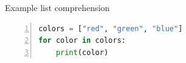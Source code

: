 \documentclass[10pt,parskip=half,
	toc=sectionentrywithdots,
	bibliography=totocnumbered,
	captions=tableheading,
    numbers=noendperiod,
    headings=standardclasses]{scrartcl}
\begin{document}
\begin{codecell}[H]

    \caption{Example list comprehension}\label{code:example_list_comp}\begin{lstlisting}[language=Python,numbers=left,xleftmargin=20pt,xrightmargin=5pt,belowskip=5pt,aboveskip=5pt]
colors = ["red", "green", "blue"]
for color in colors:
    print(color)
\end{lstlisting}\end{codecell}

\setlength\bibsep{\baselineskip} %


	
\end{document}
